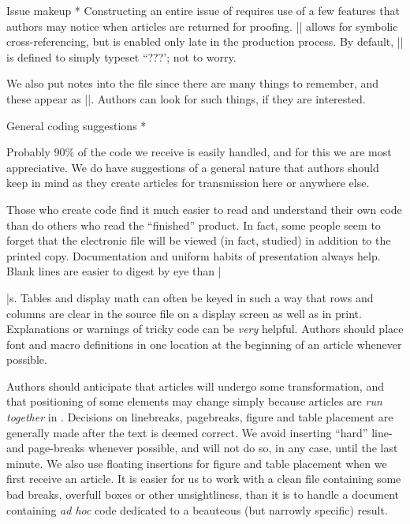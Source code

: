 {\endlist


\subhead * Issue makeup *
Constructing an entire issue of \TUB\/ requires use of a few features
that authors may notice when articles are returned for proofing.
|\xrefto| allows for symbolic cross-referencing, but is enabled only
late in the production process. By default, |\xrefto| is defined to
simply typeset ``???'; not to worry.

We also put notes into the file since there are many things to
remember, and these appear as ||.  Authors can look for
such things, if they are interested.


\head * General coding suggestions *

Probably 90\% of the code we receive is easily handled, and for this
we are most appreciative.  We do have suggestions of a general nature
that authors should keep in mind as they create articles for
transmission here or anywhere else.

Those who create code find it much easier to read and understand their
own code than do others who read the ``finished'' product.  In fact,
some people seem to forget that the electronic file will be viewed (in
fact, studied) in addition to the printed copy.  Documentation and
uniform habits of presentation always help.  Blank lines are easier to
digest by eye than |\par|s.  Tables and display math can often be
keyed in such a way that rows and columns are clear in the source file
on a display screen as well as in print.  Explanations or warnings of
tricky code can be {\it very} helpful.  Authors should place font and
macro definitions in one location at the beginning of an article
whenever possible.

Authors should anticipate that articles will undergo some
transformation, and that positioning of some elements may change
simply because articles are {\it run together\/} in \TUB.  Decisions
on linebreaks, pagebreaks, figure and table placement are generally
made after the text is deemed correct. We avoid inserting ``hard''
line- and page-breaks whenever possible, and will not do so, in any
case, until the last minute.  We also use floating insertions for
figure and table placement when we first receive an article.  It is
easier for us to work with a clean file containing some bad breaks,
overfull boxes or other unsightliness, than it is to handle a document
containing {\it ad hoc\/} code dedicated to a beauteous (but
narrowly specific) result.

}
